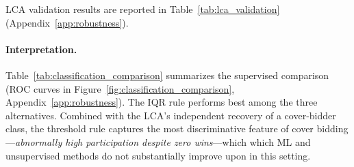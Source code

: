LCA validation results are reported in Table~\ref{tab:lca_validation}
(Appendix~\ref{app:robustness}).

\paragraph{Interpretation.}
Table~\ref{tab:classification_comparison} summarizes the supervised
comparison (ROC curves in Figure~\ref{fig:classification_comparison},
Appendix~\ref{app:robustness}). The IQR rule performs best among the three alternatives. Combined with
the LCA's independent recovery of a cover-bidder class, the threshold
rule captures the most discriminative feature of cover
bidding---\emph{abnormally high participation despite zero wins}---which
which ML and unsupervised methods do not substantially improve upon
in this setting.


